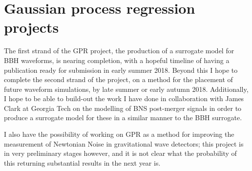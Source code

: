 \documentclass[openleft]{kentigern}
\theoremstyle{definition}
\begin{document}
\section{Gaussian process regression projects}

The first strand of the GPR project, the production of a surrogate
model for BBH waveforms, is nearing completion, with a hopeful
timeline of having a publication ready for submission in early summer
2018. Beyond this I hope to complete the second strand of the project,
on a method for the placement of future waveform simulations, by late
summer or early autumn 2018. Additionally, I hope to be able to
build-out the work I have done in collaboration with James Clark at
Georgia Tech on the modelling of BNS post-merger signals in order to
produce a surrogate model for these in a similar manner to the BBH
surrogate.

I also have the possibility of working on GPR as a method for
improving the measurement of Newtonian Noise in gravitational wave
detectors; this project is in very preliminary stages however, and it
is not clear what the probability of this returning substantial
results in the next year is.
\end{document}
